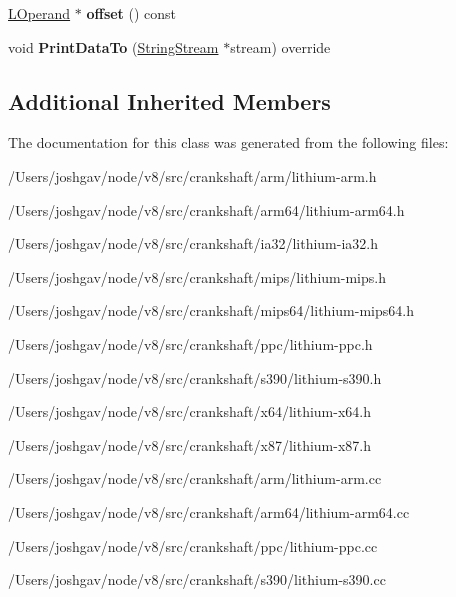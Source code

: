 \begin{DoxyCompactItemize}
\item 
\hyperlink{classv8_1_1internal_1_1_l_operand}{L\+Operand} $\ast$ {\bfseries offset} () const \hypertarget{classv8_1_1internal_1_1_l_inner_allocated_object_aad92bbf188d561ff04019227528be0bf}{}\label{classv8_1_1internal_1_1_l_inner_allocated_object_aad92bbf188d561ff04019227528be0bf}

\item 
void {\bfseries Print\+Data\+To} (\hyperlink{classv8_1_1internal_1_1_string_stream}{String\+Stream} $\ast$stream) override\hypertarget{classv8_1_1internal_1_1_l_inner_allocated_object_a9651a9ba04db7632487d46ffc2b9fba2}{}\label{classv8_1_1internal_1_1_l_inner_allocated_object_a9651a9ba04db7632487d46ffc2b9fba2}

\end{DoxyCompactItemize}
\subsection*{Additional Inherited Members}


The documentation for this class was generated from the following files\+:\begin{DoxyCompactItemize}
\item 
/\+Users/joshgav/node/v8/src/crankshaft/arm/lithium-\/arm.\+h\item 
/\+Users/joshgav/node/v8/src/crankshaft/arm64/lithium-\/arm64.\+h\item 
/\+Users/joshgav/node/v8/src/crankshaft/ia32/lithium-\/ia32.\+h\item 
/\+Users/joshgav/node/v8/src/crankshaft/mips/lithium-\/mips.\+h\item 
/\+Users/joshgav/node/v8/src/crankshaft/mips64/lithium-\/mips64.\+h\item 
/\+Users/joshgav/node/v8/src/crankshaft/ppc/lithium-\/ppc.\+h\item 
/\+Users/joshgav/node/v8/src/crankshaft/s390/lithium-\/s390.\+h\item 
/\+Users/joshgav/node/v8/src/crankshaft/x64/lithium-\/x64.\+h\item 
/\+Users/joshgav/node/v8/src/crankshaft/x87/lithium-\/x87.\+h\item 
/\+Users/joshgav/node/v8/src/crankshaft/arm/lithium-\/arm.\+cc\item 
/\+Users/joshgav/node/v8/src/crankshaft/arm64/lithium-\/arm64.\+cc\item 
/\+Users/joshgav/node/v8/src/crankshaft/ppc/lithium-\/ppc.\+cc\item 
/\+Users/joshgav/node/v8/src/crankshaft/s390/lithium-\/s390.\+cc\end{DoxyCompactItemize}
